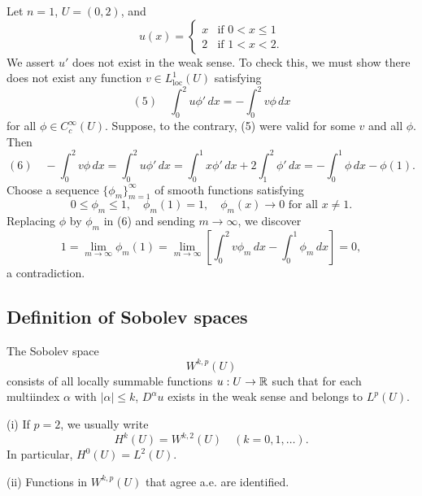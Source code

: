 \begin{example}
\label{ex:weak-derivative-nonexistence-example}

Let $n = 1$, $U = (0,2)$, and
$$u(x) = \begin{cases} x & \text{if } 0 < x \le 1 \\ 2 & \text{if } 1 < x < 2. \end{cases}$$
We assert $u'$ does not exist in the weak sense. To check this, we must show there does not exist any function $v \in L^1_{\text{loc}}(U)$ satisfying
$$(5) \quad \int_0^2 u\phi' \, dx = -\int_0^2 v\phi \, dx$$
for all $\phi \in C_c^\infty(U)$. Suppose, to the contrary, (5) were valid for some $v$ and all $\phi$. Then
$$(6) \quad -\int_0^2 v\phi \, dx = \int_0^2 u\phi' \, dx = \int_0^1 x\phi' \, dx + 2\int_1^2 \phi' \, dx = -\int_0^1 \phi \, dx - \phi(1).$$
Choose a sequence $\{\phi_m\}_{m=1}^\infty$ of smooth functions satisfying
$$0 \le \phi_m \le 1, \quad \phi_m(1) = 1, \quad \phi_m(x) \to 0 \text{ for all } x \ne 1.$$
Replacing $\phi$ by $\phi_m$ in (6) and sending $m \to \infty$, we discover
$$1 = \lim_{m \to \infty} \phi_m(1) = \lim_{m \to \infty} \left[\int_0^2 v\phi_m \, dx - \int_0^1 \phi_m \, dx\right] = 0,$$
a contradiction.
\end{example}

\subsection{Definition of Sobolev spaces}

\begin{definition}
\label{def:sobolev-space-wkp}

The Sobolev space
$$W^{k,p}(U)$$
consists of all locally summable functions $u : U \to \mathbb{R}$ such that for each multiindex $\alpha$ with $|\alpha| \le k$, $D^\alpha u$ exists in the weak sense and belongs to $L^p(U)$.
\end{definition}

\begin{remark}
\label{rem:hk-notation-identification}

(i) If $p = 2$, we usually write
$$H^k(U) = W^{k,2}(U) \quad (k = 0, 1, \ldots).$$
In particular, $H^0(U) = L^2(U)$.

(ii) Functions in $W^{k,p}(U)$ that agree a.e. are identified.
\end{remark}

